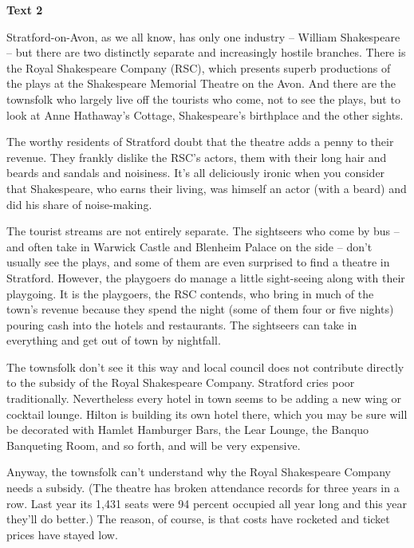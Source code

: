 \begin{center}\textbf{Text 2}\end{center}

\qquad Stratford-on-Avon, as we all know, has only one industry -- William Shakespeare -- but there are two distinctly separate and increasingly hostile branches. There is the Royal Shakespeare Company (RSC), which presents superb productions of the plays at the Shakespeare Memorial Theatre on the Avon. And there are the townsfolk who largely live off the tourists who come, not to see the plays, but to look at Anne Hathaway’s Cottage, Shakespeare’s birthplace and the other sights.

\qquad The worthy residents of Stratford doubt that the theatre adds a penny to their revenue. They frankly dislike the RSC’s actors, them with their long hair and beards and sandals and noisiness. It’s all deliciously ironic when you consider that Shakespeare, who earns their living, was himself an actor (with a beard) and did his share of noise-making.

\qquad The tourist streams are not entirely separate. The sightseers who come by bus -- and often take in Warwick Castle and Blenheim Palace on the side -- don’t usually see the plays, and some of them are even surprised to find a theatre in Stratford. However, the playgoers do manage a little sight-seeing along with their playgoing. It is the playgoers, the RSC contends, who bring in much of the town’s revenue because they spend the night (some of them four or five nights) pouring cash into the hotels and restaurants. The sightseers can take in everything and get out of town by nightfall.

\qquad The townsfolk don’t see it this way and local council does not contribute directly to the subsidy of the Royal Shakespeare Company. Stratford cries poor traditionally. Nevertheless every hotel in town seems to be adding a new wing or cocktail lounge. Hilton is building its own hotel there, which you may be sure will be decorated with Hamlet Hamburger Bars, the Lear Lounge, the Banquo Banqueting Room, and so forth, and will be very expensive.

\qquad Anyway, the townsfolk can’t understand why the Royal Shakespeare Company needs a subsidy. (The theatre has broken attendance records for three years in a row. Last year its 1,431 seats were 94 percent occupied all year long and this year they’ll do better.) The reason, of course, is that costs have rocketed and ticket prices have stayed low.

